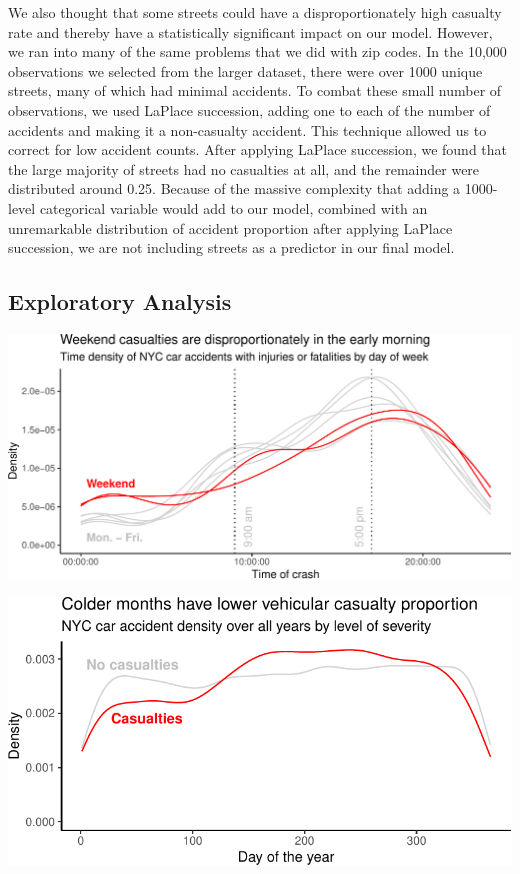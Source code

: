 \documentclass[
  letterpaper,
  DIV=11,
  numbers=noendperiod]{scrartcl}
\begin{document}
We also thought that some streets could have a disproportionately high
casualty rate and thereby have a statistically significant impact on our
model. However, we ran into many of the same problems that we did with
zip codes. In the 10,000 observations we selected from the larger
dataset, there were over 1000 unique streets, many of which had minimal
accidents. To combat these small number of observations, we used LaPlace
succession, adding one to each of the number of accidents and making it
a non-casualty accident. This technique allowed us to correct for low
accident counts. After applying LaPlace succession, we found that the
large majority of streets had no casualties at all, and the remainder
were distributed around 0.25. Because of the massive complexity that
adding a 1000-level categorical variable would add to our model,
combined with an unremarkable distribution of accident proportion after
applying LaPlace succession, we are not including streets as a predictor
in our final model.

\hypertarget{exploratory-analysis}{%
\subsection{Exploratory Analysis}\label{exploratory-analysis}}

\includegraphics{project_files/figure-pdf/viz-time-density-1.pdf}

\includegraphics{project_files/figure-pdf/viz-density-severity-day-of-year-1.pdf}
\end{document}

